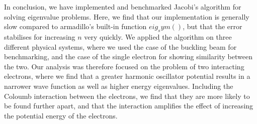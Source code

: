 In conclusion, we have implemented and benchmarked Jacobi's algorithm for solving eigenvalue problems.
Here, we find that our implementation is generally slow compared to armadillo's built-in function $eig_sym()$,
but that the error stabilises for increasing $n$ very quickly.
We applied the algorithm on three different physical systems, where we used the case
of the buckling beam for benchmarking, and the case of the single electron for
showing similarity between the two. Our analysis was therefore focused on the problem
of two interacting electrons, where we find that a greater harmonic oscillator potential
results in a narrower wave function as well as higher energy eigenvalues. Including
the Coloumb interaction between the electrons, we find that they are more likely to be
found further apart, and that the interaction amplifies the effect of increasing
the potential energy of the electrons.
